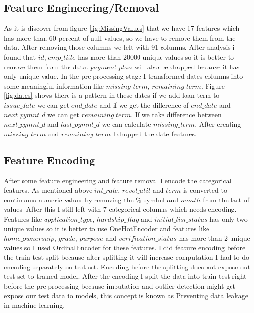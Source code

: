 \documentclass[12pt]{article}
\begin{document}
\subsection{Feature Engineering/Removal}
As it is discover from figure \ref{fig:MissingValues} that we have 17 features which has more than 60 percent of null values, so we have to remove them from the data. After removing those columns we left with 91 columns. After analysis i found that $id$, $emp\_title$ has more than 20000 unique values so it is better to remove them from the data. $payment\_plan$ will also be dropped because it has only  unique value. In the pre processing stage I transformed dates columns into some meaningful information like $missing\_term$, $remaining\_term$. Figure \ref{fig:dates} shows there is a pattern in these dates if we add loan term to $issue\_date$ we can get $end\_date$ and if we get the difference of $end\_date$ and $next\_pymnt\_d$ we can get $remaining\_term$. If we take difference between $next\_pymnt\_d$ and $last\_pymnt\_d$ we can calculate $missing\_term$. After creating $missing\_term$ and $remaining\_term$ I dropped the date features.

\subsection{Feature Encoding}
After some feature engineering and feature removal I encode the categorical features. As mentioned above $int\_rate$, $revol\_util$ and $term$ is converted to continuous numeric values by removing the $\%$ symbol and $month$ from the last of values. After this I still left with 7 categorical columns which needs encoding. Features like $application\_type$, $hardship\_flag$ and $initial\_list\_status$ has only two unique values so it is better to use OneHotEncoder and features like $home\_ownership$, $grade$, $purpose$ and $verification\_status$ has more than 2
 unique values so I used OrdinalEncoder for these features. I did feature encoding before the train-test split because after splitting it will increase computation I had to do encoding separately on test set. Encoding before the splitting does not expose out test set to trained model. After the encoding I split the data into train-test right before the pre processing because imputation and outlier detection might get expose our test data to models, this concept is known as Preventing data leakage in machine learning.
 
\end{document}
